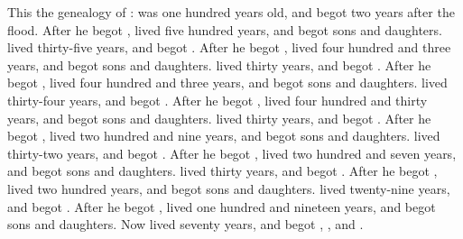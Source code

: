 
\bverse This \is the genealogy of :  was one hundred years old, and begot  two years after the flood.
\bverse After he begot ,  lived five hundred years, and begot sons and daughters.
\bverse {} lived thirty-five years, and begot .
\bverse After he begot ,  lived four hundred and three years, and begot sons and daughters.
\bverse {} lived thirty years, and begot .
\bverse After he begot ,  lived four hundred and three years, and begot sons and daughters.
\bverse {} lived thirty-four years, and begot .
\bverse After he begot ,  lived four hundred and thirty years, and begot sons and daughters.
\bverse {} lived thirty years, and begot . 
\bverse After he begot ,  lived two hundred and nine years, and begot sons and daughters.
\bverse {} lived thirty-two years, and begot .
\bverse After he begot ,  lived two hundred and seven years, and begot sons and daughters.
\bverse {} lived thirty years, and begot .
\bverse After he begot ,  lived two hundred years, and begot sons and daughters.
\bverse {} lived twenty-nine years, and begot .
\bverse After he begot ,  lived one hundred and nineteen years, and begot sons and daughters.
\bverse Now  lived seventy years, and begot , , and .


\bverse 
\bverse 
\bverse 
\bverse 
\bverse 
\bverse 
\bverse 





